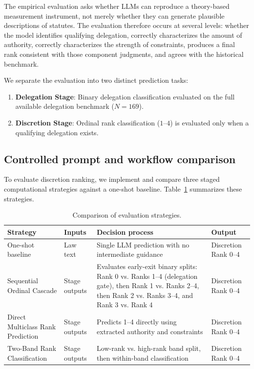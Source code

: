 \documentclass[runningheads]{llncs}
\begin{document}
The empirical evaluation asks whether LLMs can reproduce a theory-based measurement instrument, not merely whether they can generate plausible descriptions of statutes. The evaluation therefore occurs at several levels: whether the model identifies qualifying delegation, correctly characterizes the amount of authority, correctly characterizes the strength of constraints, produces a final rank consistent with those component judgments, and agrees with the historical benchmark.

We separate the evaluation into two distinct prediction tasks:
\begin{enumerate}[nosep]
    \item \textbf{Delegation Stage}: Binary delegation classification evaluated on the full available delegation benchmark ($N=169$).
    \item \textbf{Discretion Stage}: Ordinal rank classification ($1$--$4$) is evaluated only when a qualifying delegation exists.
\end{enumerate}

\vspace{-0.3 cm}
\subsection{Controlled prompt and workflow comparison}

To evaluate discretion ranking, we implement and compare three staged computational strategies against a one-shot baseline. Table~\ref{tab:strategies_comparison} summarizes these strategies.

\begin{table}[t]
\centering
\caption{Comparison of evaluation strategies.}
\label{tab:strategies_comparison}
\footnotesize
\begin{tabularx}{\textwidth}{@{}
>{\raggedright\arraybackslash}p{}
>{\raggedright\arraybackslash}p{}
>{\raggedright\arraybackslash}X
>{\raggedright\arraybackslash}p{}@{}}
\toprule
\textbf{Strategy} & \textbf{Inputs} & \textbf{Decision process} & \textbf{Output} \\
\midrule
One-shot baseline & Law text & Single LLM prediction with no intermediate guidance & Discretion Rank 0--4 \\
Sequential Ordinal Cascade & Stage outputs & Evaluates early-exit binary splits: Rank 0 vs. Ranks 1--4 (delegation gate), then Rank 1 vs. Ranks 2--4, then Rank 2 vs. Ranks 3--4, and Rank 3 vs. Rank 4 & Discretion Rank 0--4 \\
Direct Multiclass Rank Prediction & Stage outputs & Predicts 1--4 directly using extracted authority and constraints & Discretion Rank 0--4 \\
Two-Band Rank Classification & Stage outputs & Low-rank vs. high-rank band split, then within-band classification & Discretion Rank 0--4 \\
\bottomrule
\end{tabularx}
\end{table}
\vspace{-0.3 cm}
\end{document}
